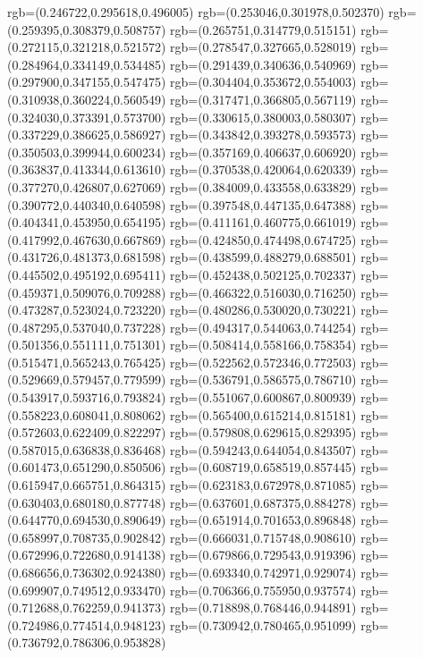 {{{			rgb=(0.246722,0.295618,0.496005)
			rgb=(0.253046,0.301978,0.502370)
			rgb=(0.259395,0.308379,0.508757)
			rgb=(0.265751,0.314779,0.515151)
			rgb=(0.272115,0.321218,0.521572)
			rgb=(0.278547,0.327665,0.528019)
			rgb=(0.284964,0.334149,0.534485)
			rgb=(0.291439,0.340636,0.540969)
			rgb=(0.297900,0.347155,0.547475)
			rgb=(0.304404,0.353672,0.554003)
			rgb=(0.310938,0.360224,0.560549)
			rgb=(0.317471,0.366805,0.567119)
			rgb=(0.324030,0.373391,0.573700)
			rgb=(0.330615,0.380003,0.580307)
			rgb=(0.337229,0.386625,0.586927)
			rgb=(0.343842,0.393278,0.593573)
			rgb=(0.350503,0.399944,0.600234)
			rgb=(0.357169,0.406637,0.606920)
			rgb=(0.363837,0.413344,0.613610)
			rgb=(0.370538,0.420064,0.620339)
			rgb=(0.377270,0.426807,0.627069)
			rgb=(0.384009,0.433558,0.633829)
			rgb=(0.390772,0.440340,0.640598)
			rgb=(0.397548,0.447135,0.647388)
			rgb=(0.404341,0.453950,0.654195)
			rgb=(0.411161,0.460775,0.661019)
			rgb=(0.417992,0.467630,0.667869)
			rgb=(0.424850,0.474498,0.674725)
			rgb=(0.431726,0.481373,0.681598)
			rgb=(0.438599,0.488279,0.688501)
			rgb=(0.445502,0.495192,0.695411)
			rgb=(0.452438,0.502125,0.702337)
			rgb=(0.459371,0.509076,0.709288)
			rgb=(0.466322,0.516030,0.716250)
			rgb=(0.473287,0.523024,0.723220)
			rgb=(0.480286,0.530020,0.730221)
			rgb=(0.487295,0.537040,0.737228)
			rgb=(0.494317,0.544063,0.744254)
			rgb=(0.501356,0.551111,0.751301)
			rgb=(0.508414,0.558166,0.758354)
			rgb=(0.515471,0.565243,0.765425)
			rgb=(0.522562,0.572346,0.772503)
			rgb=(0.529669,0.579457,0.779599)
			rgb=(0.536791,0.586575,0.786710)
			rgb=(0.543917,0.593716,0.793824)
			rgb=(0.551067,0.600867,0.800939)
			rgb=(0.558223,0.608041,0.808062)
			rgb=(0.565400,0.615214,0.815181)
			rgb=(0.572603,0.622409,0.822297)
			rgb=(0.579808,0.629615,0.829395)
			rgb=(0.587015,0.636838,0.836468)
			rgb=(0.594243,0.644054,0.843507)
			rgb=(0.601473,0.651290,0.850506)
			rgb=(0.608719,0.658519,0.857445)
			rgb=(0.615947,0.665751,0.864315)
			rgb=(0.623183,0.672978,0.871085)
			rgb=(0.630403,0.680180,0.877748)
			rgb=(0.637601,0.687375,0.884278)
			rgb=(0.644770,0.694530,0.890649)
			rgb=(0.651914,0.701653,0.896848)
			rgb=(0.658997,0.708735,0.902842)
			rgb=(0.666031,0.715748,0.908610)
			rgb=(0.672996,0.722680,0.914138)
			rgb=(0.679866,0.729543,0.919396)
			rgb=(0.686656,0.736302,0.924380)
			rgb=(0.693340,0.742971,0.929074)
			rgb=(0.699907,0.749512,0.933470)
			rgb=(0.706366,0.755950,0.937574)
			rgb=(0.712688,0.762259,0.941373)
			rgb=(0.718898,0.768446,0.944891)
			rgb=(0.724986,0.774514,0.948123)
			rgb=(0.730942,0.780465,0.951099)
			rgb=(0.736792,0.786306,0.953828)
}}}
